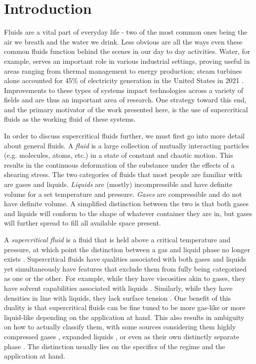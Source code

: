 \chapter{Introduction}

Fluids are a vital part of everyday life - two of the most common ones being the air we breath and the water we drink. Less obvious are all the ways even these common fluids function behind the scenes in our day to day activities. Water, for example, serves an important role in various industrial settings, proving useful in areas ranging from thermal management to energy production; steam turbines alone accounted for 45\% of electricity generation in the United States in 2021 \cite{US_elec_gen_stat}. Improvements to these types of systems impact technologies across a variety of fields and are thus an important area of research. One strategy toward this end, and the primary motivator of the work presented here, is the use of supercritical fluids as the working fluid of these systems.  

In order to discuss supercritical fluids further, we must first go into more detail about general fluids. A \textit{fluid} is a large collection of mutually interacting particles (e.g. molecules, atoms, etc.) in a state of constant and chaotic motion. This results in the continuous deformation of the substance under the effects of a shearing stress. The two categories of fluids that most people are familiar with are gases and liquids. \textit{Liquids} are (mostly) incompressible and have definite volume for a set temperature and pressure. \textit{Gases} are compressible and do not have definite volume. A simplified distinction between the two is that both gases and liquids will conform to the shape of whatever container they are in, but gases will further spread to fill all available space present. 

A \textit{supercritical fluid} is a fluid that is held above a critical temperature and pressure, at which point the distinction between a gas and liquid phase no longer exists \cite{SCF2, SCF1}. Supercritical fluids have qualities associated with both gases and liquids yet simultaneously have features that exclude them from fully being categorized as one or the other. For example, while they have viscosities akin to gases, they have solvent capabilities associated with liquids \cite{}. Similarly, while they have densities in line with liquids, they lack surface tension \cite{}. One benefit of this duality is that supercritical fluids can be fine tuned to be more gas-like or more liquid-like depending on the application at hand. This also results in ambiguity on how to actually classify them, with some sources considering them highly compressed gases \cite{Gordon}, expanded liquids \cite{Aggarwal}, or even as their own distinctly separate phase \cite{BANUTI201512}. The distinction usually lies on the specifics of the regime and the application at hand. 

